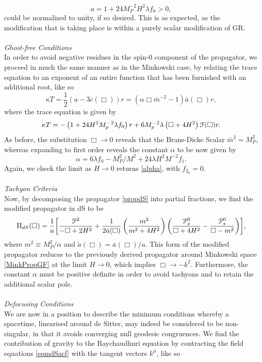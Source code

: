  \[
 \label{dSa}
 a=1+24M_{P}^{-2}H^{2}\lambda f_{0}>0
 ,\]
could be normalized to unity, if so desired. This is as expected, as the modification that is taking place is within a purely scalar modification of GR.
\\\\\emph{Ghost-free Conditions}\\
In order to avoid negative residues in the spin-0 component of the propagator, we proceed in much the same manner as in the Minkowski case, by relating the trace equation to an exponent of an entire function that has been furnished with an additional root, like so 
\[
\label{propdS}
\kappa T=\frac{1}{2}(a-3c(\Box))r=(\alpha \Box {\bar m}^{-2}-1){\bar a}(\Box)r,
\] 
where the trace equation is given by
  \[
\kappa T=-\left(1+24H^{2}M_{p}^{-2}\lambda f_{0}\right)r+6M_{p}^{-2}\lambda\left(\Box+4H^{2}\right){\cal F}(\Box)r
.  \]
As before, the substitution $\Box\rightarrow 0$ reveals that the Brans-Dicke Scalar ${\bar m}^2=M_P^2$, whereas expanding to first order reveals the constant $\alpha$ to be now given by
\[
\alpha=6\lambda f_{0}-M_{P}^{2}/M^{2}+24\lambda H^{2}M^{-2}f_{1}.
\]
Again, we check the limit as $H\rightarrow0$ returns \eqref{alpha}, with $f_{2_0}=0$. 
\\\\\emph{Tachyon Criteria}\\
Now, by decomposing the propagator \eqref{propdS} into partial fractions, we find the modified propagator in dS to be
\[
\Pi_{dS}(\Box)=\frac{1}{a}\biggl[\frac{{\cal P}^{2}}{-\Box+2H^{2}}+\frac{1}{2\tilde{a}(\Box)}\left(\frac{m^{2}}{m^{2}+4H^{2}}\right)\left(\frac{{\cal P}_{s}^{0}}{\Box+4H^{2}}-\frac{{\cal P}_{s}^{0}}{\Box-m^{2}}\right)\biggr]
,\]
where  $m^{2}\equiv M_{P}^{2}/\alpha$ and ${\tilde a}(\Box)={\bar a}(\Box)/a$. This form of the modified propagator reduces to the previously derived propagator around Minkowski space \eqref{MinkPropGF} at the limit $H\rightarrow 0$, which implies $\Box\rightarrow -k^2$. Furthermore, the constant $\alpha$ must be positive definite in order to avoid tachyons and to retain the additional scalar pole. 
  \\\\\emph{Defocusing Conditions}\\
  We are now in a position to describe the minimum conditions whereby a spacetime, linearised around de Sitter, may indeed be considered to be non-singular, in that it avoids converging null geodesic congruences. We find the contribution of gravity to the Raychaudhuri equation by contracting the field equations \eqref{eomdSacf} with the tangent vectors $k^\mu$, like so
